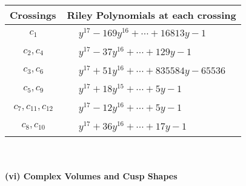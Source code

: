 \documentclass[1p]{elsarticle_modified}
\theoremstyle{definition}
\begin{document}
\begin{tabular}{m{50pt}|m{274pt}}
Crossings & \hspace{64pt}Riley Polynomials at each crossing \\
\hline $$\begin{aligned}c_{1}\end{aligned}$$&$\begin{aligned}
&y^{17}-169 y^{16}+\cdots+16813 y-1
\end{aligned}$\\
\hline $$\begin{aligned}c_{2},c_{4}\end{aligned}$$&$\begin{aligned}
&y^{17}-37 y^{16}+\cdots+129 y-1
\end{aligned}$\\
\hline $$\begin{aligned}c_{3},c_{6}\end{aligned}$$&$\begin{aligned}
&y^{17}+51 y^{16}+\cdots+835584 y-65536
\end{aligned}$\\
\hline $$\begin{aligned}c_{5},c_{9}\end{aligned}$$&$\begin{aligned}
&y^{17}+18 y^{15}+\cdots+5 y-1
\end{aligned}$\\
\hline $$\begin{aligned}c_{7},c_{11},c_{12}\end{aligned}$$&$\begin{aligned}
&y^{17}-12 y^{16}+\cdots+5 y-1
\end{aligned}$\\
\hline $$\begin{aligned}c_{8},c_{10}\end{aligned}$$&$\begin{aligned}
&y^{17}+36 y^{16}+\cdots+17 y-1
\end{aligned}$\\
\hline
\end{tabular}\\~\\
\newpage\flushleft \textbf{(vi) Complex Volumes and Cusp Shapes}
\end{document}
